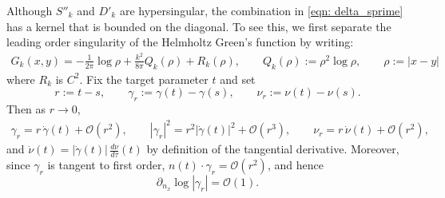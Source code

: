 \documentclass{amsart}
\theoremstyle{plain}
\begin{document}
Although $S''_k$ and $D'_k$ are hypersingular, the combination in \eqref{eqn: delta_sprime}
has a kernel that is bounded on the diagonal.
To see this, we first separate the leading order singularity of the Helmholtz Green's function by writing:
\begin{align}
  G_k(x,y) = -\frac{1}{2\pi}\log\rho + \frac{k^2}{8\pi}Q_k(\rho) + R_k(\rho),
  \quad\quad Q_k(\rho):=\rho^2\log\rho,
  \quad\quad \rho:=|x-y|
\end{align}
where $R_k$ is $C^2$. Fix the target parameter $t$ and set
\[
r:=t-s,\qquad \gamma_r:=\gamma(t)-\gamma(s),\qquad \nu_r:=\nu(t)-\nu(s).
\]
Then as $r\to 0$,
\begin{align}
  \gamma_r = r\,\dot\gamma(t) + \mathcal{O}(r^2),\qquad
  |\gamma_r|^2 = r^2|\dot\gamma(t)|^2 + \mathcal{O}(r^3),\qquad
  \nu_r = r\,\dot\nu(t) + \mathcal{O}(r^2),
\end{align}
and $\dot\nu(t)=|\dot\gamma(t)|\,\frac{d\nu}{d\tau}(t)$ by definition of the
tangential derivative. Moreover, since $\gamma_r$ is tangent to first order,
$n(t)\cdot\gamma_r=\mathcal{O}(r^2)$, and hence
\[
\partial_{n_x}\log|\gamma_r| = \mathcal{O}(1).
\]
\end{document}
